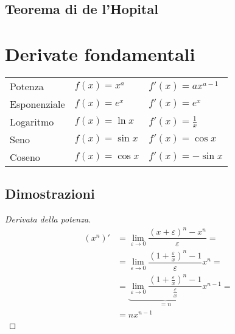 \subsection{Teorema di de l'Hopital}
\begin{theorem}\label{thm:hopital}
\end{theorem}

\section{Derivate fondamentali}
\begin{center}
    \begin{tabular}{lll}
        Potenza      & $f(x) = x^a$       & $f'(x) = a x^{a-1}$    \\
        Esponenziale & $f(x) = e^x$       & $f'(x) = e^x$          \\
        Logaritmo    & $f(x) = \ln x$     & $f'(x) = \frac{1}{x}$  \\
        Seno         & $f(x) = \sin x$    & $f'(x) = \cos x$       \\
        Coseno       & $f(x) = \cos x$    & $f'(x) =-\sin x$       \\
    \end{tabular}
\end{center}
\subsection{Dimostrazioni}
\begin{proof}[Derivata della potenza]
\begin{equation}
    \begin{aligned}
    (x^n)'
        & = \lim_{\varepsilon \rightarrow 0 } \dfrac{(x+\varepsilon)^n - x^n}{\varepsilon} = \\
        & = \lim_{\varepsilon \rightarrow 0 } \dfrac{ \left( 1 + \frac{\varepsilon}{x} \right)^n - 1 }{\varepsilon} x^n = \\
        & = \underbrace{\lim_{\varepsilon \rightarrow 0 } \dfrac{ \left( 1 + \frac{\varepsilon}{x} \right)^n - 1 }{\frac{\varepsilon}{x}}}_{=n} x^{n-1} = \\
        & = n x^{n-1}
    \end{aligned}
\end{equation}
\end{proof}

